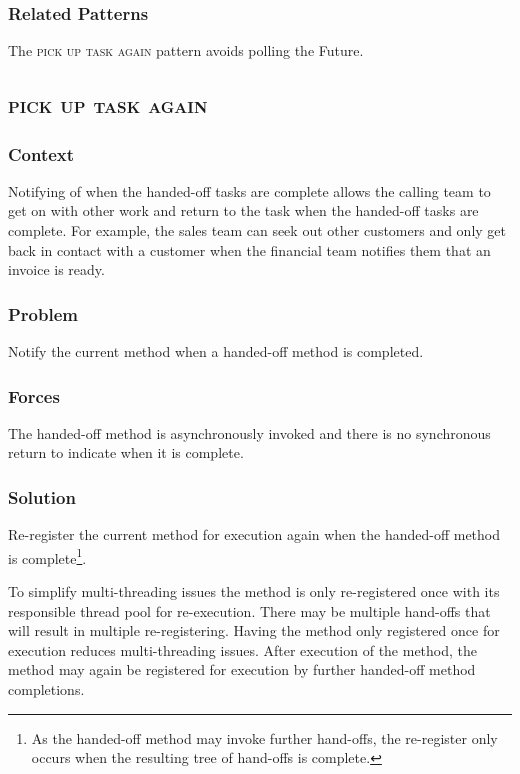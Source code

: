 \documentclass[prodmode]{style/acmlarge}
\begin{document}
\subsubsection*{Related Patterns} The \textsc{pick up task again} pattern avoids
polling the Future.



\subsection{\textsc{\textbf{pick up task again}}}

\subsubsection*{Context} Notifying of when the handed-off tasks are complete allows
the calling team to get on with other work and return to the task when the
handed-off tasks are complete.  For example, the sales team can seek out other
customers and only get back in contact with a customer when the financial team
notifies them that an invoice is ready.

\subsubsection*{Problem} Notify the current method when a handed-off method is
completed.

\subsubsection*{Forces} The handed-off method is asynchronously invoked and there is
no synchronous return to indicate when it is complete.

\subsubsection*{Solution} Re-register the current method for execution again
when the handed-off method is complete\footnote{As the handed-off method may
invoke further hand-offs, the re-register only occurs when the resulting tree of
hand-offs is complete.}.

To simplify multi-threading issues the method is only re-registered once with
its responsible thread pool for re-execution.  There may be multiple hand-offs
that will result in multiple re-registering.  Having the method only registered
once for execution reduces multi-threading issues.  After execution of the
method, the method may again be registered for execution by further handed-off
method completions.
\end{document}
